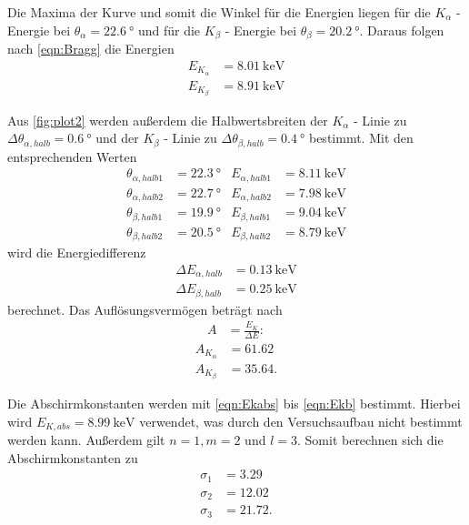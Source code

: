 Die Maxima der Kurve und somit die Winkel für die Energien liegen für die 
$K_\alpha$ -Energie  bei $\theta_\alpha=\qty{22.6}{\degree}$ und für die $K_\beta$ - Energie
bei $\theta_\beta=\qty{20.2}{\degree}$.
Daraus folgen nach \autoref{eqn:Bragg} die Energien
\begin{align*}
  E_{K_\alpha}&= \qty{8.01}{\kilo\electronvolt}\\
  E_{K_\beta}&= \qty{8.91}{\kilo\electronvolt}
\end{align*} 


Aus \autoref{fig:plot2} werden außerdem die Halbwertsbreiten der $K_\alpha$ - Linie zu $\Delta\theta_{\alpha,halb}=\qty{0.6}{\degree}$ und
der $K_\beta$ - Linie zu $\Delta\theta_{\beta,halb}=\qty{0.4}{\degree}$ bestimmt.
Mit den entsprechenden Werten  
\begin{align*}
  \theta_{\alpha,halb1}&=\qty{22.3}{\degree}  & E_{\alpha,halb1}&= \qty{8.11}{\kilo\electronvolt}\\
  \theta_{\alpha,halb2}&=\qty{22.7}{\degree}  & E_{\alpha,halb2}&= \qty{7.98}{\kilo\electronvolt}\\
  \theta_{\beta,halb1}&=\qty{19.9}{\degree}    & E_{\beta,halb1}&= \qty{9.04}{\kilo\electronvolt}\\
  \theta_{\beta,halb2}&=\qty{20.5}{\degree}  & E_{\beta,halb2}&= \qty{8.79}{\kilo\electronvolt}
 \end{align*}
wird die Energiedifferenz
\begin{align*}
 \Delta E_{\alpha,halb}&= \qty{0.13}{\kilo\electronvolt}\\
 \Delta E_{\beta,halb}&= \qty{0.25}{\kilo\electronvolt}
\end{align*}
berechnet.
Das Auflösungsvermögen beträgt nach 
\begin{align*}
  A &= \frac{E_K}{\Delta E}:
\end{align*}
\begin{align*}
  A_{K_\alpha} &= 61.62\\
  A_{K_\beta} &= 35.64.
\end{align*}


Die Abschirmkonstanten werden mit \autoref{eqn:Ekabs} bis \autoref{eqn:Ekb} bestimmt. Hierbei wird
$E_{K,abs}= \qty{8.99}{\kilo\electronvolt}$\cite{X-Ray} verwendet, was durch den Versuchsaufbau nicht bestimmt werden kann.
Außerdem gilt $n=1, m=2$ und $l=3$.
Somit berechnen sich die Abschirmkonstanten zu
\begin{align*}
  \sigma_1 &= 3.29\\
  \sigma_2 &= 12.02\\
  \sigma_3 &= 21.72.
\end{align*}

